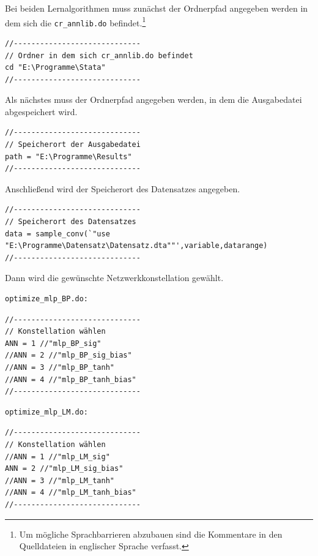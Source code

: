 Bei beiden Lernalgorithmen muss zunächst der Ordnerpfad angegeben werden in dem sich die \verb|cr_annlib.do| befindet.\footnote{Um mögliche Sprachbarrieren abzubauen sind die Kommentare in den Quelldateien in englischer Sprache verfasst.}

{
\begin{lstlisting}[firstnumber=3]
//-----------------------------
// Ordner in dem sich cr_annlib.do befindet
cd "E:\Programme\Stata"
//-----------------------------
\end{lstlisting}
}

\newpage
Als nächstes muss der Ordnerpfad angegeben werden, in dem die Ausgabedatei abgespeichert wird. 


{
\begin{lstlisting}[firstnumber=224]
//-----------------------------
// Speicherort der Ausgabedatei
path = "E:\Programme\Results"
//-----------------------------
\end{lstlisting}
}

Anschließend wird der Speicherort des Datensatzes angegeben.

{
\begin{lstlisting}[firstnumber=256]
//-----------------------------
// Speicherort des Datensatzes
data = sample_conv(`"use "E:\Programme\Datensatz\Datensatz.dta""',variable,datarange)
//-----------------------------
\end{lstlisting}
}

Dann wird die gewünschte Netzwerkkonstellation gewählt.
\begin{Verbatim}
optimize_mlp_BP.do:
\end{Verbatim}
{
\begin{lstlisting}[firstnumber=213]
//-----------------------------
// Konstellation wählen
ANN = 1 //"mlp_BP_sig"
//ANN = 2 //"mlp_BP_sig_bias"
//ANN = 3 //"mlp_BP_tanh"
//ANN = 4 //"mlp_BP_tanh_bias"
//-----------------------------
\end{lstlisting}
}

\begin{Verbatim}
optimize_mlp_LM.do:
\end{Verbatim}
{
\begin{lstlisting}[firstnumber=213]
//-----------------------------
// Konstellation wählen
//ANN = 1 //"mlp_LM_sig"
ANN = 2 //"mlp_LM_sig_bias"
//ANN = 3 //"mlp_LM_tanh"
//ANN = 4 //"mlp_LM_tanh_bias"
//-----------------------------
\end{lstlisting}
}


